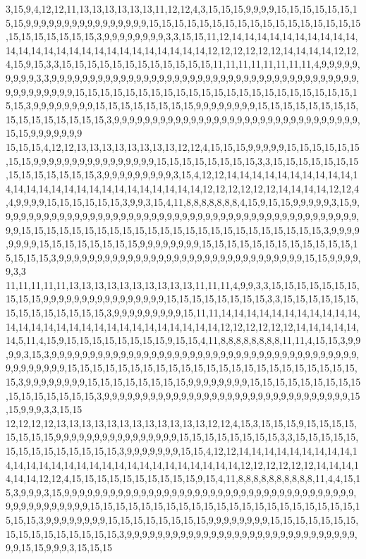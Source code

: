 3,15,9,4,12,12,11,13,13,13,13,13,13,11,12,12,4,3,15,15,15,9,9,9,9,15,15,15,15,15,15,15,15,9,9,9,9,9,9,9,9,9,9,9,9,9,9,9,9,15,15,15,15,15,15,15,15,15,15,15,15,15,15,15,15,15,15,15,15,15,15,15,15,3,9,9,9,9,9,9,9,9,3,3,15,15,11,12,14,14,14,14,14,14,14,14,14,14,14,14,14,14,14,14,14,14,14,14,14,14,14,14,14,14,12,12,12,12,12,12,14,14,14,14,12,12,4,15,9,15,3,3,15,15,15,15,15,15,15,15,15,15,15,15,11,11,11,11,11,11,11,11,4,9,9,9,9,9,9,9,9,9,3,3,9,9,9,9,9,9,9,9,9,9,9,9,9,9,9,9,9,9,9,9,9,9,9,9,9,9,9,9,9,9,9,9,9,9,9,9,9,9,9,9,9,9,9,9,9,9,9,9,9,15,15,15,15,15,15,15,15,15,15,15,15,15,15,15,15,15,15,15,15,15,15,15,15,3,9,9,9,9,9,9,9,9,15,15,15,15,15,15,15,15,9,9,9,9,9,9,9,9,15,15,15,15,15,15,15,15,15,15,15,15,15,15,15,15,3,9,9,9,9,9,9,9,9,9,9,9,9,9,9,9,9,9,9,9,9,9,9,9,9,9,9,9,9,9,9,9,9,15,15,9,9,9,9,9,9,9
15,15,15,4,12,12,13,13,13,13,13,13,13,13,12,12,4,15,15,15,9,9,9,9,9,15,15,15,15,15,15,15,15,9,9,9,9,9,9,9,9,9,9,9,9,9,9,9,9,15,15,15,15,15,15,15,15,3,3,15,15,15,15,15,15,15,15,15,15,15,15,15,15,3,9,9,9,9,9,9,9,9,9,3,15,4,12,12,14,14,14,14,14,14,14,14,14,14,14,14,14,14,14,14,14,14,14,14,14,14,14,14,14,14,12,12,12,12,12,12,14,14,14,14,12,12,4,4,9,9,9,9,15,15,15,15,15,15,3,9,9,3,15,4,11,8,8,8,8,8,8,8,4,15,9,15,15,9,9,9,9,9,3,15,9,9,9,9,9,9,9,9,9,9,9,9,9,9,9,9,9,9,9,9,9,9,9,9,9,9,9,9,9,9,9,9,9,9,9,9,9,9,9,9,9,9,9,9,9,9,9,9,9,15,15,15,15,15,15,15,15,15,15,15,15,15,15,15,15,15,15,15,15,15,15,15,15,3,9,9,9,9,9,9,9,9,15,15,15,15,15,15,15,15,9,9,9,9,9,9,9,9,15,15,15,15,15,15,15,15,15,15,15,15,15,15,15,15,3,9,9,9,9,9,9,9,9,9,9,9,9,9,9,9,9,9,9,9,9,9,9,9,9,9,9,9,9,9,9,9,9,15,15,9,9,9,9,9,3,3
11,11,11,11,11,13,13,13,13,13,13,13,13,13,13,11,11,11,4,9,9,3,3,15,15,15,15,15,15,15,15,15,15,9,9,9,9,9,9,9,9,9,9,9,9,9,9,9,9,15,15,15,15,15,15,15,15,3,3,15,15,15,15,15,15,15,15,15,15,15,15,15,15,3,9,9,9,9,9,9,9,9,9,15,11,11,14,14,14,14,14,14,14,14,14,14,14,14,14,14,14,14,14,14,14,14,14,14,14,14,14,14,14,14,12,12,12,12,12,12,14,14,14,14,14,14,5,11,4,15,9,15,15,15,15,15,15,15,15,9,15,15,4,11,8,8,8,8,8,8,8,8,11,11,4,15,15,3,9,9,9,9,3,15,3,9,9,9,9,9,9,9,9,9,9,9,9,9,9,9,9,9,9,9,9,9,9,9,9,9,9,9,9,9,9,9,9,9,9,9,9,9,9,9,9,9,9,9,9,9,9,9,9,15,15,15,15,15,15,15,15,15,15,15,15,15,15,15,15,15,15,15,15,15,15,15,15,3,9,9,9,9,9,9,9,9,15,15,15,15,15,15,15,15,9,9,9,9,9,9,9,9,15,15,15,15,15,15,15,15,15,15,15,15,15,15,15,15,3,9,9,9,9,9,9,9,9,9,9,9,9,9,9,9,9,9,9,9,9,9,9,9,9,9,9,9,9,9,9,9,9,15,15,9,9,9,3,3,15,15
12,12,12,12,13,13,13,13,13,13,13,13,13,13,13,13,12,12,4,15,3,15,15,15,9,15,15,15,15,15,15,15,15,9,9,9,9,9,9,9,9,9,9,9,9,9,9,9,9,15,15,15,15,15,15,15,15,3,3,15,15,15,15,15,15,15,15,15,15,15,15,15,15,3,9,9,9,9,9,9,9,15,15,4,12,12,14,14,14,14,14,14,14,14,14,14,14,14,14,14,14,14,14,14,14,14,14,14,14,14,14,14,14,14,12,12,12,12,12,12,14,14,14,14,14,14,12,12,4,15,15,15,15,15,15,15,15,15,15,9,15,4,11,8,8,8,8,8,8,8,8,8,8,11,4,4,15,15,3,9,9,9,3,15,9,9,9,9,9,9,9,9,9,9,9,9,9,9,9,9,9,9,9,9,9,9,9,9,9,9,9,9,9,9,9,9,9,9,9,9,9,9,9,9,9,9,9,9,9,9,9,9,9,15,15,15,15,15,15,15,15,15,15,15,15,15,15,15,15,15,15,15,15,15,15,15,15,3,9,9,9,9,9,9,9,9,15,15,15,15,15,15,15,15,9,9,9,9,9,9,9,9,15,15,15,15,15,15,15,15,15,15,15,15,15,15,15,15,3,9,9,9,9,9,9,9,9,9,9,9,9,9,9,9,9,9,9,9,9,9,9,9,9,9,9,9,9,9,9,9,9,15,15,9,9,9,3,15,15,15
